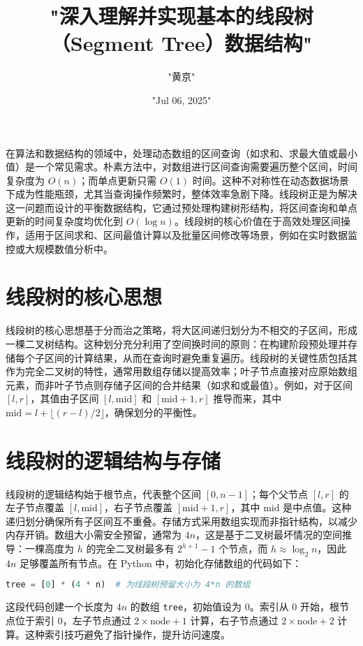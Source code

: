 \title{"深入理解并实现基本的线段树（Segment Tree）数据结构"}
\author{"黄京"}
\date{"Jul 06, 2025"}
\maketitle
在算法和数据结构的领域中，处理动态数组的区间查询（如求和、求最大值或最小值）是一个常见需求。朴素方法中，对数组进行区间查询需要遍历整个区间，时间复杂度为 $O(n)$；而单点更新只需 $O(1)$ 时间。这种不对称性在动态数据场景下成为性能瓶颈，尤其当查询操作频繁时，整体效率急剧下降。线段树正是为解决这一问题而设计的平衡数据结构，它通过预处理构建树形结构，将区间查询和单点更新的时间复杂度均优化到 $O(\log n)$。线段树的核心价值在于高效处理区间操作，适用于区间求和、区间最值计算以及批量区间修改等场景，例如在实时数据监控或大规模数值分析中。\par
\chapter{线段树的核心思想}
线段树的核心思想基于分而治之策略，将大区间递归划分为不相交的子区间，形成一棵二叉树结构。这种划分充分利用了空间换时间的原则：在构建阶段预处理并存储每个子区间的计算结果，从而在查询时避免重复遍历。线段树的关键性质包括其作为完全二叉树的特性，通常用数组存储以提高效率；叶子节点直接对应原始数组元素，而非叶子节点则存储子区间的合并结果（如求和或最值）。例如，对于区间 $[l, r]$，其值由子区间 $[l, \text{mid}]$ 和 $[\text{mid}+1, r]$ 推导而来，其中 $\text{mid} = l + \lfloor (r - l) / 2 \rfloor$，确保划分的平衡性。\par
\chapter{线段树的逻辑结构与存储}
线段树的逻辑结构始于根节点，代表整个区间 $[0, n-1]$；每个父节点 $[l, r]$ 的左子节点覆盖 $[l, \text{mid}]$，右子节点覆盖 $[\text{mid}+1, r]$，其中 $\text{mid}$ 是中点值。这种递归划分确保所有子区间互不重叠。存储方式采用数组实现而非指针结构，以减少内存开销。数组大小需安全预留，通常为 $4n$，这是基于二叉树最坏情况的空间推导：一棵高度为 $h$ 的完全二叉树最多有 $2^{h+1} - 1$ 个节点，而 $h \approx \log_2 n$，因此 $4n$ 足够覆盖所有节点。在 Python 中，初始化存储数组的代码如下：\par
\begin{lstlisting}[language=python]
tree = [0] * (4 * n)  # 为线段树预留大小为 4*n 的数组
\end{lstlisting}
这段代码创建一个长度为 $4n$ 的数组 \texttt{tree}，初始值设为 0。索引从 0 开始，根节点位于索引 0，左子节点通过 $2 \times \text{node} + 1$ 计算，右子节点通过 $2 \times \text{node} + 2$ 计算。这种索引技巧避免了指针操作，提升访问速度。\par
